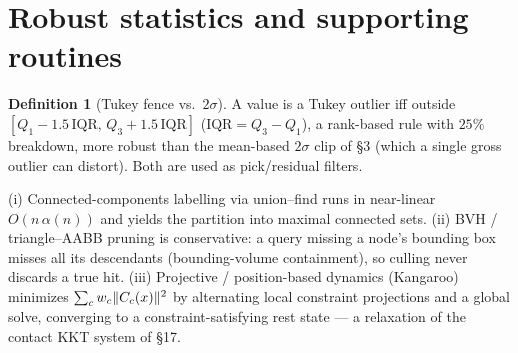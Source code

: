 \documentclass[11pt]{article}
\theoremstyle{definition}\newtheorem{definition}{Definition}[section]
\theoremstyle{plain}\newtheorem{theorem}{Theorem}[section]
\begin{document}
\section{Robust statistics and supporting routines}
\begin{definition}[Tukey fence vs.\ $2\sigma$]
A value is a Tukey outlier iff outside $[Q_1-1.5\,\mathrm{IQR},\,Q_3+1.5\,\mathrm{IQR}]$ ($\mathrm{IQR}=Q_3-Q_1$),
a rank-based rule with $25\%$ breakdown, more robust than the mean-based $2\sigma$ clip of \S3 (which a single
gross outlier can distort). Both are used as pick/residual filters.
\end{definition}
\begin{proposition}
(i) Connected-components labelling via union--find runs in near-linear $O(n\,\alpha(n))$ and yields the
partition into maximal connected sets. (ii) BVH / triangle--AABB pruning is conservative: a query missing a
node's bounding box misses all its descendants (bounding-volume containment), so culling never discards a true
hit. (iii) Projective / position-based dynamics (Kangaroo) minimizes $\sum_c w_c\lVert C_c(x)\rVert^2$ by alternating
local constraint projections and a global solve, converging to a constraint-satisfying rest state --- a
relaxation of the contact KKT system of \S17.
\end{proposition}
\end{document}
